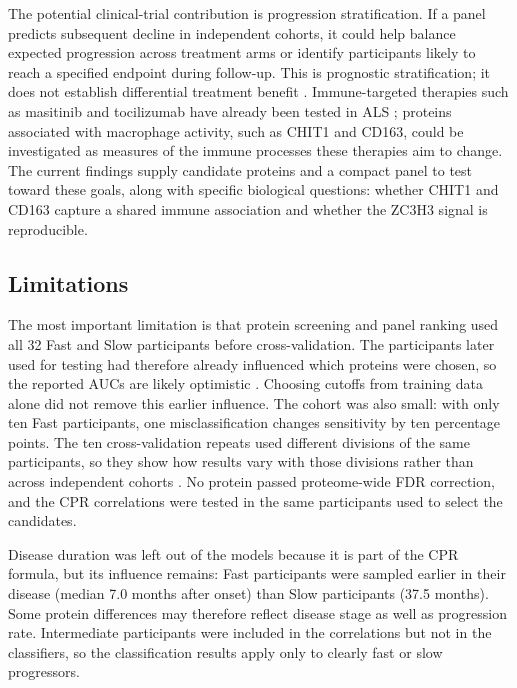 \documentclass[11pt,letterpaper]{article}
\begin{document}
The potential clinical-trial contribution is progression stratification. If a panel predicts subsequent decline in independent cohorts, it could help balance expected progression across treatment arms or identify participants likely to reach a specified endpoint during follow-up. This is prognostic stratification; it does not establish differential treatment benefit \citep{fda2019}. Immune-targeted therapies such as masitinib and tocilizumab have already been tested in ALS \citep{mora2020,milligan2021}; proteins associated with macrophage activity, such as CHIT1 and CD163, could be investigated as measures of the immune processes these therapies aim to change. The current findings supply candidate proteins and a compact panel to test toward these goals, along with specific biological questions: whether CHIT1 and CD163 capture a shared immune association and whether the ZC3H3 signal is reproducible.

\subsection{Limitations}

The most important limitation is that protein screening and panel ranking used all 32 Fast and Slow participants before cross-validation. The participants later used for testing had therefore already influenced which proteins were chosen, so the reported AUCs are likely optimistic \citep{ambroise2002,varma2006,cawley2010}. Choosing cutoffs from training data alone did not remove this earlier influence. The cohort was also small: with only ten Fast participants, one misclassification changes sensitivity by ten percentage points. The ten cross-validation repeats used different divisions of the same participants, so they show how results vary with those divisions rather than across independent cohorts \citep{varoquaux2018,vabalas2019}. No protein passed proteome-wide FDR correction, and the CPR correlations were tested in the same participants used to select the candidates.

Disease duration was left out of the models because it is part of the CPR formula, but its influence remains: Fast participants were sampled earlier in their disease (median 7.0 months after onset) than Slow participants (37.5 months). Some protein differences may therefore reflect disease stage as well as progression rate. Intermediate participants were included in the correlations but not in the classifiers, so the classification results apply only to clearly fast or slow progressors.
\end{document}
